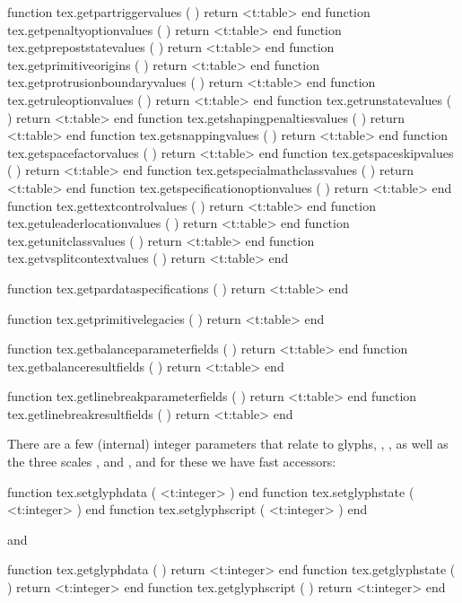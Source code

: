 function tex.getpartriggervalues           ( ) return <t:table> end
function tex.getpenaltyoptionvalues        ( ) return <t:table> end
function tex.getprepoststatevalues         ( ) return <t:table> end
function tex.getprimitiveorigins           ( ) return <t:table> end
function tex.getprotrusionboundaryvalues   ( ) return <t:table> end
function tex.getruleoptionvalues           ( ) return <t:table> end
function tex.getrunstatevalues             ( ) return <t:table> end
function tex.getshapingpenaltiesvalues     ( ) return <t:table> end
function tex.getsnappingvalues             ( ) return <t:table> end
function tex.getspacefactorvalues          ( ) return <t:table> end
function tex.getspaceskipvalues            ( ) return <t:table> end
function tex.getspecialmathclassvalues     ( ) return <t:table> end
function tex.getspecificationoptionvalues  ( ) return <t:table> end
function tex.gettextcontrolvalues          ( ) return <t:table> end
function tex.getuleaderlocationvalues      ( ) return <t:table> end
function tex.getunitclassvalues            ( ) return <t:table> end
function tex.getvsplitcontextvalues        ( ) return <t:table> end

function tex.getpardataspecifications      ( ) return <t:table> end

function tex.getprimitivelegacies          ( ) return <t:table> end

function tex.getbalanceparameterfields     ( ) return <t:table> end
function tex.getbalanceresultfields        ( ) return <t:table> end

function tex.getlinebreakparameterfields   ( ) return <t:table> end
function tex.getlinebreakresultfields      ( ) return <t:table> end
\stoptyping
\stopsubsection

\startsubsection [title={Glyphs}]

There are a few (internal) integer parameters that relate to glyphs, \typ
{\glyphdatafield}, \typ {\glyphstatefield}, \typ {\glyphscriptfield} as well as
the three scales \typ {\glyphscale}, \typ {\glyphxscale} and \typ
{\glyphyscale}, and for these we have fast accessors:

\starttyping[option=LUA]
function tex.setglyphdata   ( <t:integer> ) end
function tex.setglyphstate  ( <t:integer> ) end
function tex.setglyphscript ( <t:integer> ) end
\stoptyping

and

\starttyping[option=LUA]
function tex.getglyphdata   ( ) return <t:integer> end
function tex.getglyphstate  ( ) return <t:integer> end
function tex.getglyphscript ( ) return <t:integer> end
\stoptyping

